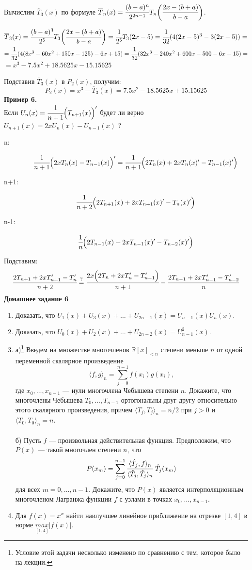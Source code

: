 \documentclass[12pt]{article}
\theoremstyle{definition}
\numberwithin{equation}{section}
\begin{document}
Вычислим $\overline T_3(x)$ по формуле $\overline T_n(x) = \cfrac{(b-a)^n}{2^{2n-1}}T_n \bigg(\cfrac{2x-(b+a)}{b-a} \bigg)$.\\
\begin{center}
$\overline T_3(x)=\cfrac{(b-a)^3}{2^5}T_3 \bigg(\cfrac{2x-(b+a)}{b-a}\bigg) =\cfrac{1}{2^5}T_3(2x-5)=\cfrac{1}{32}(4(2x-5)^3-3(2x-5))=$\\
$=\cfrac{1}{32}(4(8x^3-60x^2+150x-125)-6x+15)=\cfrac{1}{32}(32x^3-240x^2+600x-500-6x+15)=$\\
$=x^3-7.5x^2+18.5625x-15.15625$\end{center}
Подставив $\overline T_3(x)$ в $P_2(x)$, получим:
$$P_2(x)=x^3-\overline T_3(x)=7.5x^2-18.5625x+15.15625$$ 
\textbf{Пример 6.}\\
Если $U_n(x)=\cfrac{1}{n+1} \Big(T_{n+1}(x)\Big)'$ будет ли верно $U_{n+1}(x)=2xU_n(x)-U_{n-1}(x)$ ?
\begin{description} 
\item[n:]
$$\cfrac{1}{n+1}\Big(2xT_n(x)-T_{n-1}(x)\Big)'=\cfrac{1}{n+1}\Big(2T_n(x)+2xT_n(x)'-T_{n-1}(x)'\Big)$$
\item[n+1:]
$$\cfrac{1}{n+2}\Big(2T_{n+1}(x)+2xT_{n+1}(x)'-T_n(x)'\Big)$$
\item[n-1:]
$$\cfrac{1}{n}\Big(2T_{n-1}(x)+2xT_{n-1}(x)'-T_{n-2}(x)'\Big)$$
\end{description}
Подставим:
$$\cfrac{2T_{n+1}+2xT_{n+1}'-T_n'}{n+2} \overset{?}{=}\cfrac{2x\Big(2T_n+2xT_n'-T_{n-1}'\Big)}{n+1}-\cfrac{2T_{n-1}+2xT_{n-1}'-T_{n-2}'}{n}$$
\textbf{Домашнее задание 6}\begin{enumerate}
\item
Доказать, что $U_1(x)+U_3(x)+\dots+U_{2n-1}(x)=U_{n-1}(x)U_n(x).$
\item
Доказать, что $U_0(x)+U_2(x)+\dots+U_{2n-2}(x)=U_{n-1}^2(x).$
\item 
а)\footnote{Условие этой задачи несколько изменено по сравнению с тем, которое было на лекции.} Введем на множестве многочленов $\mathbb{R} [x]_{<n}$ 
степени меньше $n$ от одной переменной скалярное произведение
$$
\langle f,g
\rangle_n
= \sum\limits_{j=0}^{n-1} f(x_i) g(x_i),
$$
где $x_0, \dots,x_{n-1}$ --- нули многочлена Чебышева степени $n$.
Докажите, что многочлены Чебышева $T_0, \dots, T_{n-1}$ ортогональны друг другу относительно этого скалярного произведения, причем $\langle T_j,T_j
\rangle_n = n/2$ при $j>0$ и $\langle T_0,T_0
\rangle_n = n$.\\ \\
б) Пусть $f$ --- произвольная действительная функция. Предположим, что 
$P(x)$ --- такой многочлен степени $n$, что 
$$P(x_m)=
\sum\limits_{j=0}^{n-1}\cfrac{\langle \hat T_j, f\rangle_n}{\langle \hat T_j, \hat T_j\rangle_n}~\hat T_j(x_m)$$
для всех $m=0,\dots,n-1$. 
Докажите, что $P(x)$  является интерполяционным многочленом Лагранжа функции $f$ с узлами в точках $x_0, \dots,x_{n-1}$. 
\item
Для $f(x)=x^x$ найти наилучшее линейное приближение на отрезке $[1, 4]$ в норме $\underset{[1, 4]}{max}|f(x)|$.
\end{enumerate}
\end{document}
